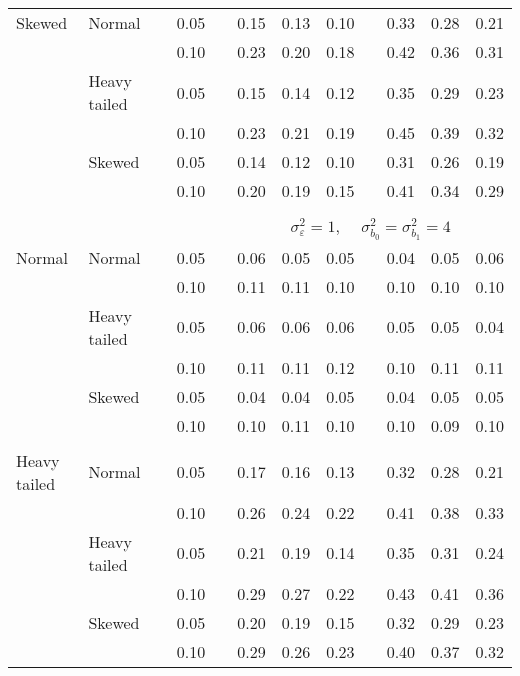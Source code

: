 \begin{table}[ht]
\begin{scriptsize}
\begin{tabular}{ll p{.1cm} c p{.1cm} rrr p{.1cm} rrr}
Skewed       & Normal       && 0.05 &&  0.15 & 0.13 & 0.10 && 0.33 & 0.28 & 0.21 \\ 
             &              && 0.10 &&  0.23 & 0.20 & 0.18 && 0.42 & 0.36 & 0.31 \\ 
             & Heavy tailed && 0.05 &&  0.15 & 0.14 & 0.12 && 0.35 & 0.29 & 0.23 \\ 
             &              && 0.10 &&  0.23 & 0.21 & 0.19 && 0.45 & 0.39 & 0.32 \\ 
             & Skewed       && 0.05 &&  0.14 & 0.12 & 0.10 && 0.31 & 0.26 & 0.19 \\ 
             &              && 0.10 &&  0.20 & 0.19 & 0.15 && 0.41 & 0.34 & 0.29 \\ 


&&&&&&&&&&&\\
& && && \multicolumn{7}{c}{$\sigma_{\varepsilon}^2 = 1$, \ \ $\sigma_{b_0}^2 = \sigma_{b_1}^2 = 4$} \\ \cline{6-12}
\rowcolor{gray!20}Normal       & Normal       && 0.05 &&  0.06 & 0.05 & 0.05 && 0.04 & 0.05 & 0.06 \\ 
\rowcolor{gray!20}             &              && 0.10 &&  0.11 & 0.11 & 0.10 && 0.10 & 0.10 & 0.10 \\ 
\rowcolor{gray!20}             & Heavy tailed && 0.05 &&  0.06 & 0.06 & 0.06 && 0.05 & 0.05 & 0.04 \\ 
\rowcolor{gray!20}             &              && 0.10 &&  0.11 & 0.11 & 0.12 && 0.10 & 0.11 & 0.11 \\ 
\rowcolor{gray!20}             & Skewed       && 0.05 &&  0.04 & 0.04 & 0.05 && 0.04 & 0.05 & 0.05 \\ 
\rowcolor{gray!20}             &              && 0.10 &&  0.10 & 0.11 & 0.10 && 0.10 & 0.09 & 0.10 \\ 
             &&&&&&&&&&&\\
Heavy tailed & Normal       && 0.05 &&  0.17 & 0.16 & 0.13 && 0.32 & 0.28 & 0.21 \\ 
             &              && 0.10 &&  0.26 & 0.24 & 0.22 && 0.41 & 0.38 & 0.33 \\ 
             & Heavy tailed && 0.05 &&  0.21 & 0.19 & 0.14 && 0.35 & 0.31 & 0.24 \\ 
             &              && 0.10 &&  0.29 & 0.27 & 0.22 && 0.43 & 0.41 & 0.36 \\ 
             & Skewed       && 0.05 &&  0.20 & 0.19 & 0.15 && 0.32 & 0.29 & 0.23 \\ 
             &              && 0.10 &&  0.29 & 0.26 & 0.23 && 0.40 & 0.37 & 0.32 \\ 

\end{tabular}
\end{scriptsize}
\end{table}
